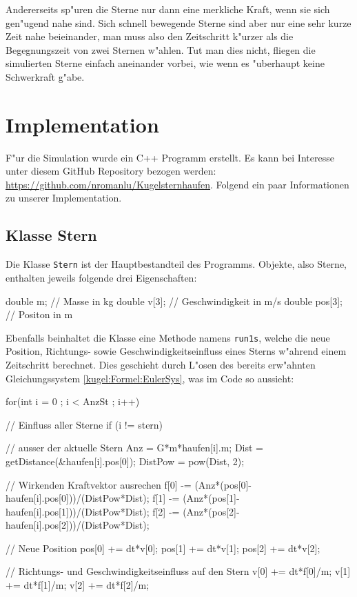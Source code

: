 \begin{refsection}
    Andererseits sp"uren die Sterne nur dann eine merkliche Kraft, wenn sie sich gen"ugend nahe sind. Sich schnell bewegende Sterne sind aber nur eine sehr kurze Zeit nahe beieinander, man muss also den Zeitschritt k"urzer als die Begegnungszeit von zwei Sternen w"ahlen. Tut man dies nicht, fliegen die simulierten Sterne einfach aneinander vorbei, wie wenn es "uberhaupt keine Schwerkraft g"abe. 
     
\section{Implementation}
	F"ur die Simulation wurde ein C++ Programm erstellt. Es kann bei Interesse unter diesem GitHub Repository bezogen werden: \url{https://github.com/nromanlu/Kugelsternhaufen}.
	Folgend ein paar Informationen zu unserer Implementation.
	
	\subsection{Klasse Stern}
	Die Klasse \texttt{Stern} ist der Hauptbestandteil des Programms. Objekte, also Sterne, enthalten jeweils folgende drei Eigenschaften:
\begin{Cpp}
double m;			// Masse in kg
double v[3];		// Geschwindigkeit in m/s
double pos[3];		// Positon in m 
\end{Cpp}
	Ebenfalls beinhaltet die Klasse eine Methode namens \texttt{run1s}, welche die neue Position, Richtungs- sowie Geschwindigkeitseinfluss eines Sterns w"ahrend einem Zeitschritt berechnet. Dies geschieht durch L"osen des bereits erw"ahnten Gleichungssystem \ref{kugel:Formel:EulerSys}, was im Code so aussieht: 
\begin{Cpp}
for(int i = 0 ; i < AnzSt ; i++){	// Einfluss aller Sterne
	if (i != stern) {				// ausser der aktuelle Stern
		Anz = G*m*haufen[i].m;
		Dist = getDistance(&haufen[i].pos[0]);
		DistPow = pow(Dist, 2);

		// Wirkenden Kraftvektor ausrechen
		f[0] -= (Anz*(pos[0]-haufen[i].pos[0]))/(DistPow*Dist);
		f[1] -= (Anz*(pos[1]-haufen[i].pos[1]))/(DistPow*Dist);
		f[2] -= (Anz*(pos[2]-haufen[i].pos[2]))/(DistPow*Dist);
	}
}
// Neue Position
pos[0] += dt*v[0];
pos[1] += dt*v[1];
pos[2] += dt*v[2];

// Richtungs- und Geschwindigkeitseinfluss auf den Stern
v[0] += dt*f[0]/m;
v[1] += dt*f[1]/m;
v[2] += dt*f[2]/m;
\end{Cpp}
	

\end{refsection}

